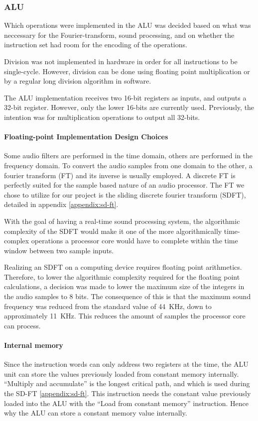 \FloatBarrier
\subsubsection{ALU}\label{subsec:fpga-alu}

Which operations were implemented in the ALU was decided based on what
was neccessary for the Fourier-transform, sound processing, and on whether the
instruction set had room for the encoding of the operations.

Division was not implemented in hardware in order for all instructions to be
single-cycle. However, division can be done using floating point multiplication
or by a regular long division algorithm in software.

The ALU implementation receives two 16-bit registers as inputs, and outputs a
32-bit register. However, only the lower 16-bits are currently used. Previously,
the intention was for multiplication operations to output all 32-bits.

\paragraph{Floating-point Implementation Design Choices}

Some audio filters are performed in the time domain, others are performed in the
frequency domain. To convert the audio samples from one domain to the other, a
fourier transform (FT) and its inverse is usually employed. A discrete FT is
perfectly suited for the sample based nature of an audio processor. The FT we
chose to utilize for our project is the
sliding discrete fourier transform (SDFT), detailed in appendix \ref{appendix:sd-ft}.

With the goal of having a real-time sound processing system, the algorithmic
complexity of the SDFT would make it one of the more algorithmically
time-complex operations a processor core would have to complete within the
time window between two sample inputs.

Realizing an SDFT on a computing device requires floating point arithmetics.
Therefore, to lower the algorithmic complexity required for the floating point
calculations, a decision was made to lower the maximum size of the integers in
the audio samples to 8 bits. The consequence of this is that the maximum sound
frequency was reduced from the standard value of 44~KHz, down to approximately 11~KHz.
This reduces the amount of samples the processor core can process.

\paragraph{Internal memory}

Since the instruction words can only address two registers at the time, the ALU
unit can store the values previously loaded from constant memory internally.
``Multiply and accumulate'' is the longest critical path, and which is used
during the SD-FT \ref{appendix:sd-ft}. This instruction needs the constant value
previously loaded into the ALU with the ``Load from constant memory''
instruction. Hence why the ALU can store a constant memory value internally.
